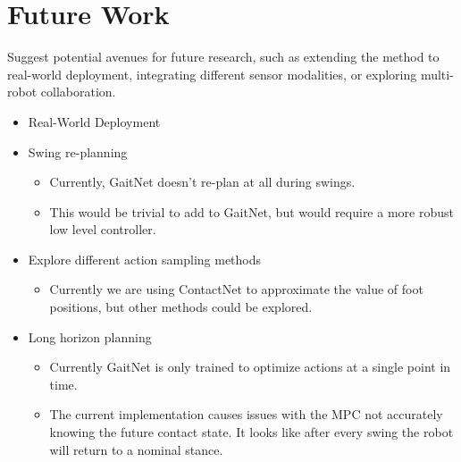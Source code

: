 \section{Future Work}

\begin{outline}
  Suggest potential avenues for future research, such as extending
  the method to real-world deployment, integrating different sensor
  modalities, or exploring multi-robot collaboration.
\end{outline}

\begin{itemize}
  \item Real-World Deployment

  \item Swing re-planning
    \begin{itemize}
      \item Currently, GaitNet doesn't re-plan at all during swings.
      \item This would be trivial to add to GaitNet, but would require
        a more robust low level controller.
    \end{itemize}

  \item Explore different action sampling methods
    \begin{itemize}
      \item Currently we are using ContactNet to approximate the
        value of foot positions, but other methods could be explored.
    \end{itemize}

  \item Long horizon planning
    \begin{itemize}
      \item Currently GaitNet is only trained to optimize actions
        at a single point in time.
      \item The current implementation causes issues with the MPC
        not accurately knowing the future contact state. It looks
        like after every swing the robot will return to a nominal stance.
    \end{itemize}
\end{itemize}
